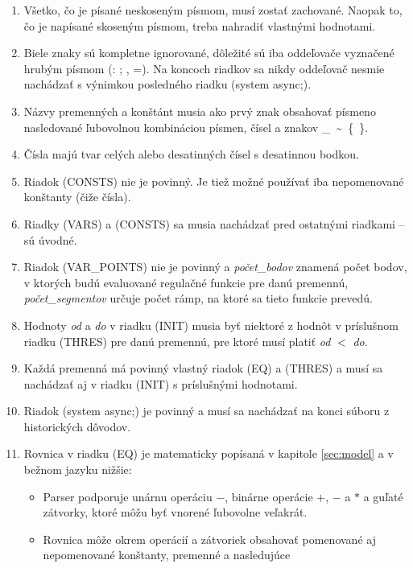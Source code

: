 \documentclass[11pt,final,oneside]{fithesis}
\begin{document}
\begin{enumerate}
\item V\v setko, \v co je p\'isan\'e neskosen\'ym p\'ismom, mus\'i zosta\v t zachovan\'e. Naopak to, \v co je nap\'isan\'e skosen\'ym p\'ismom, treba 
nahradi\v t vlastn\'ymi hodnotami.
\item Biele znaky s\'u kompletne ignorovan\'e, d\^ ole\v zit\'e s\'u iba odde\v lova\v ce vyzna\v cen\'e hrub\'ym p\'ismom (: ; , =). Na koncoch riadkov sa 
nikdy odde\v lova\v c nesmie nach\'adza\v t s v\'ynimkou posledn\'eho riadku (system async;).
\item N\'azvy premenn\'ych a kon\v st\'ant musia ako prv\'y znak obsahova\v t p\'ismeno nasledovan\'e \v lubovolnou kombin\'aciou p\'ismen, \v c\'isel a 
znakov \_\ \textasciitilde{}\ \{\ \}.
\item \v C\'isla maj\'u tvar cel\'ych alebo desatinn\'ych \v c\'isel s desatinnou bodkou.
\item Riadok (CONSTS) nie je povinn\'y. Je tie\v z mo\v zn\'e pou\v z\'iva\v t iba nepomenovan\'e kon\v stanty (\v ci\v ze \v c\'isla).
\item Riadky (VARS) a (CONSTS) sa musia nach\'adza\v t pred ostatn\'ymi riadkami -- s\'u \'uvodn\'e.
\item Riadok (VAR\_POINTS) nie je povinn\'y a \textit{po\v cet\_bodov} znamen\'a po\v cet bodov, v ktor\'ych bud\'u evaluovan\'e regula\v cn\'e funkcie 
pre dan\'u premenn\'u, {\it po\v cet\_segmentov} ur\v cuje po\v cet r\'amp, na ktor\'e sa tieto funkcie preved\'u.
\item Hodnoty {\it od} a {\it do} v riadku (INIT) musia by\v t niektor\'e z hodn\^ ot v pr\'islu\v snom riadku (THRES) pre dan\'u premenn\'u, pre ktor\'e
mus\'i plati\v t {\it od} $<$ {\it do}.
\item Ka\v zd\'a premenn\'a m\'a povinn\'y vlastn\'y riadok (EQ) a (THRES) a mus\'i sa nach\'adza\v t aj v riadku (INIT) s pr\'islu\v sn\'ymi hodnotami.
\item Riadok (system async;) je povinn\'y a mus\'i sa nach\'adza\v t na konci s\'uboru z historick\'ych d\^ ovodov.
\item Rovnica v riadku (EQ) je matematicky pop\'isan\'a v kapitole \ref{sec:model} a v be\v znom jazyku 
ni\v z\v sie:
\begin{itemize}
\item Parser podporuje un\'arnu oper\'aciu $-$, bin\'arne oper\'acie $+$, $-$ a $*$ a gu\v lat\'e z\'atvorky, ktor\'e m\^ o\v zu by\v t vnoren\'e \v lubovolne
ve\v lakr\'at.
\item Rovnica m\^ o\v ze okrem oper\'aci\'i a z\'atvoriek obsahova\v t pomenovan\'e aj nepomenovan\'e kon\v stanty, premenn\'e a nasleduj\'uce 

\end{itemize}
\end{enumerate}
\end{document}
